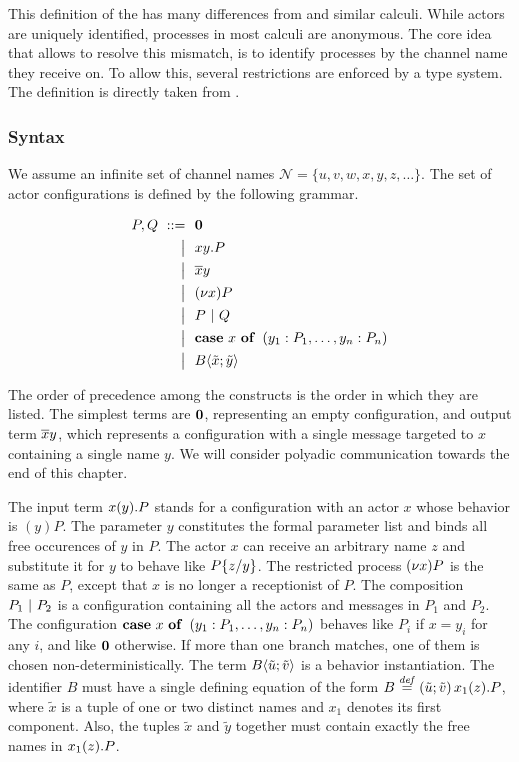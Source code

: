 This definition of the \actormodel has many differences from
\joincalc and similar calculi.
While actors are uniquely identified,
processes in most calculi are anonymous.
The core idea that allows \actorpicalc to resolve this mismatch,
is to identify processes by the channel name they receive on.
To allow this, several restrictions are enforced by a type system.
The definition is directly taken from \cite{agha_algebraic_2004}.

\subsubsection{Syntax}

We assume an infinite set of channel names
$ \mathcal{N} = \{u, v, w, x, y, z, \ldots\} $.
The set of actor configurations is defined by the following grammar.

\begin{align*}
  P, Q
  \grmr \anullproc
  \altn \amrcv{x}{y} . P
  \altn \amsnd{x}{y}
  \altn \anew{x}{P}
  \altn P \apar Q
  \altn \acse{x}{\aalt{y_1}{P_1}, \dots, \aalt{y_n}{P_n}}
  \altn \ains{B}{\tilde{x}}{\tilde{y}}
\end{align*}

The order of precedence among the constructs is the order in which they are
listed.
The simplest terms are $\textbf{\textup{0}}$, representing an empty configuration,
and output term $\overline{x} y$, which represents a configuration with a single message
targeted to $x$ containing a single name $y$.
We will consider polyadic communication towards the end of this chapter.

The input term $x(y) . P$ stands for a configuration with an actor
$x$ whose behavior is $(y) P$.
The parameter $y$ constitutes the formal parameter list and binds all
free occurences of $y$ in $P$.
The actor $x$ can receive an arbitrary name $z$
and substitute it for $y$ to behave like $P \{ z / y \}$.
The restricted process $\anew{x}{P}$ is the same as $P$,
except that $x$ is no longer a receptionist of $P$.
The composition $P_1 \ |\  P_2$ is a configuration containing
all the actors and messages in $P_1$ and $P_2$.
The configuration
$\acse{x}{\aalt{y_1}{P_1}, \ldots, \aalt{y_n}{P_n}}$
behaves like $P_i$ if $x = y_i$ for any $i$,
and like $\textbf{\textup{0}}$ otherwise.
If more than one branch matches, one of them is chosen non-deterministically.
The term $B \langle \tilde{u} ; \tilde{v} \rangle$ is a behavior instantiation.
The identifier $B$ must have a single defining equation of the form
$\adef{B}{\tilde{u}}{\tilde{v}}{\arcv{x_1}{z} . P}$,
where $\tilde{x}$ is a tuple of one or two distinct names
and $x_1$ denotes its first component.
Also, the tuples $\tilde{x}$ and $\tilde{y}$ together must contain
exactly the free names in $x_1(z) . P$.


